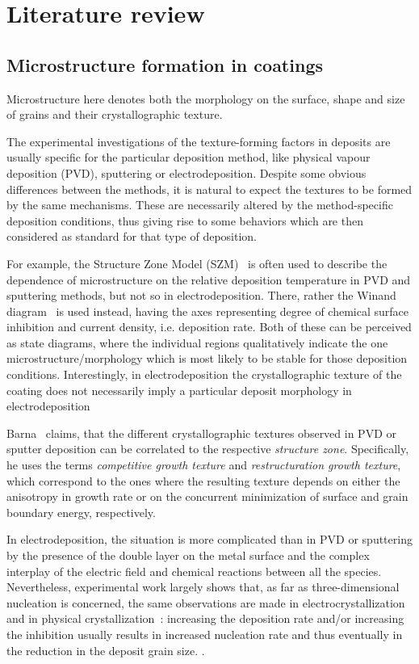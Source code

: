 \chapter{Literature review}\label{ch_anisoIEintro}

\section{Microstructure formation in coatings}
Microstructure here denotes both the morphology on the surface, shape and size of grains and their crystallographic texture.

The experimental investigations of the texture-forming factors in deposits are usually specific for the particular deposition method, like physical vapour deposition (PVD), sputtering or electrodeposition. Despite some obvious differences between the methods, it is natural to expect the textures to be formed by the same mechanisms. These are necessarily altered by the method-specific deposition conditions, thus giving rise to some behaviors which are then considered as standard for that type of deposition. 

For example, the Structure Zone Model (SZM)~\cite{Barna1998} is often used to describe the dependence of microstructure on the relative deposition temperature in PVD and sputtering methods, but not so in electrodeposition. There, rather the Winand diagram~\cite{Winand1992} is used instead, having the axes representing degree of chemical surface inhibition and current density, i.e. deposition rate. Both of these can be perceived as state diagrams, where the individual regions qualitatively indicate the one microstructure/morphology which is most likely to be stable for those deposition conditions. Interestingly, in electrodeposition the crystallographic texture of the coating does not necessarily imply a particular deposit morphology in electrodeposition

Barna~\cite{Barna1998} claims, that the different crystallographic textures observed in PVD or sputter deposition can be correlated to the respective \textit{structure zone}. Specifically, he uses the terms \textit{competitive growth texture} and \textit{restructuration growth texture}, which correspond to the ones where the resulting texture depends on either the anisotropy in growth rate or on the concurrent minimization of surface and grain boundary energy, respectively.

In electrodeposition, the situation is more complicated than in PVD or sputtering by the presence of the double layer on the metal surface and the complex interplay of the electric field and chemical reactions between all the species.  Nevertheless, experimental work largely shows that, as far as three-dimensional nucleation is concerned, the same observations are made in electrocrystallization
and in physical crystallization~\cite{Winand1992}: increasing the deposition rate and/or increasing the inhibition usually results in increased nucleation rate and thus eventually in the reduction in the deposit grain size. .

